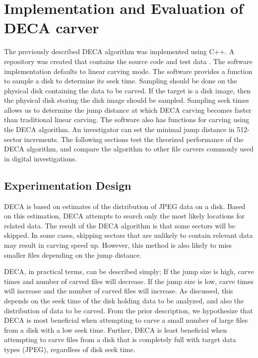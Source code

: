 \documentclass[final,5p,times,twocolumn,authoryear]{elsarticle}
\begin{document}
\section{Implementation and Evaluation of DECA carver} \label{sec:implement}
The previously described DECA algorithm was implemented using C++. A repository was created that contains the source code and test data \citep{gladyshevjames2015}. The software implementation defaults to linear carving mode. The software provides a function to sample a disk to determine its seek time. Sampling should be done on the physical disk containing the data to be carved. If the target is a disk image, then the physical disk storing the disk image should be sampled. Sampling seek times allows us to determine the jump distance at which DECA carving becomes faster than traditional linear carving. The software also has functions for carving using the DECA algorithm. An investigator can set the minimal jump distance in 512-sector increments. The following sections test the theorized performance of the DECA algorithm, and compare the algorithm to other file carvers commonly used in digital investigations.

\subsection{Experimentation Design}
DECA is based on estimates of the distribution of JPEG data on a disk. Based on this estimation, DECA attempts to search only the most likely locations for related data. The result of the DECA algorithm is that some sectors will be skipped. In some cases, skipping sectors that are unlikely to contain relevant data may result in carving speed up. However, this method is also likely to miss smaller files depending on the jump distance.

DECA, in practical terms, can be described simply; If the jump size is high, carve times and number of carved files will decrease. If the jump size is low, carve times will increase and the number of carved files will increase. As discussed, this depends on the seek time of the disk holding data to be analyzed, and also the distribution of data to be carved. From the prior description, we hypothesize that DECA is most beneficial when attempting to carve a small number of large files from a disk with a low seek time. Further, DECA is least beneficial when attempting to carve files from a disk that is completely full with target data types (JPEG), regardless of disk seek time.
\end{document}
